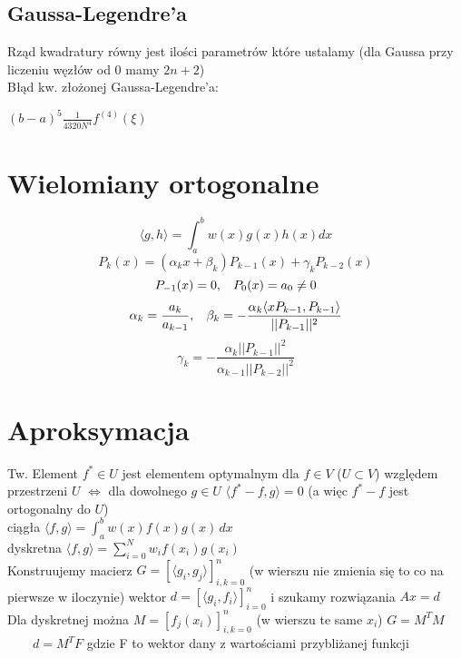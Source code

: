 \documentclass[twocolumn]{article}
\begin{document}
\begin{flushleft}
\subsection{Gaussa-Legendre’a}
Rząd kwadratury równy jest ilości parametrów które ustalamy (dla Gaussa przy liczeniu węzłów od 0 mamy $2n+2$)\\
Błąd kw. złożonej Gaussa-Legendre’a:\\
\begin{center}
$(b-a)^5\frac{1}{4320N^4}f^{(4)}(\xi)$
\end{center}

\section{Wielomiany ortogonalne}
$$\langle g,h\rangle= \int_{a}^{b} w(x)g(x)h(x)dx$$
$$P_k (x) = ( \alpha_k x + \beta_k )P_{k-1} (x) + \gamma_k P_{k-2} (x)$$
$$P_{-1} (x) = 0, \hspace{3mm} P_0 (x) = a_0 \neq 0$$
$$\alpha_k = \frac{ a_k }{ a_{k-1} },\hspace{3mm} \beta_k = -\frac{ \alpha_k  \langle xP_{k-1} , P_{k-1} \rangle } { ||P_{k-1}||^2 }$$
$$ \gamma_k = -\frac{ \alpha_k ||P_{k-1}||^2}{ \alpha_{k-1} ||P_{k-2}||^2}$$

\section{Aproksymacja}
Tw. Element $f^* \in U$ jest elementem optymalnym dla $f\in V$ ($U \subset V$) względem przestrzeni $U$ $\iff$ dla dowolnego $g \in U$ $\langle f^* -f,g\rangle = 0$ (a więc $f^* -f$ jest ortogonalny do $U$)\\
\vspace{3mm}
ciągła $\langle f,g \rangle = \int_a^b w(x)f(x)g(x) \,dx$\\
dyskretna $\langle f,g \rangle = \sum_{i=0}^Nw_if(x_i)g(x_i)$\\\vspace{3mm}
Konstruujemy macierz $G = \left[\langle g_i,g_j \rangle\right]_{i,k = 0}^n$ (w wierszu nie zmienia się to co na pierwsze w iloczynie) wektor $d = \left[\langle g_i, f_i\rangle \right]_{i = 0}^n$ i szukamy rozwiązania $Ax=d$\\
Dla dyskretnej można $M = \left[f_j(x_i)\right]_{i,k = 0}^n$ (w wierszu te same $x_i$) $G = M^TM$ \ \ \ \  $d = M^TF$ gdzie F to wektor dany z wartościami przybliżanej funkcji

\end{flushleft}
\end{document}

